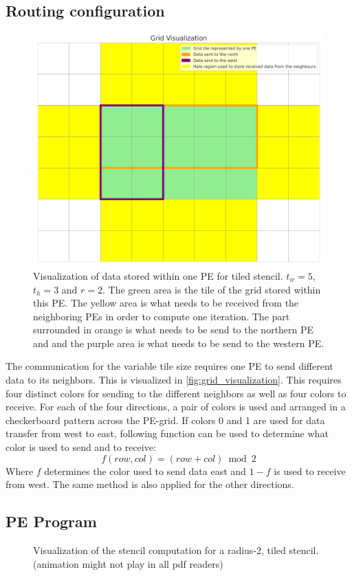 \subsection{Routing configuration}
\begin{figure}
    \centering
    \includegraphics[width=0.5\linewidth]{plots/grid_visualization.png}
    \caption{Visualization of data stored within one PE for tiled stencil. $t_w=5$, $t_h=3$ and $r=2$. The green area is the tile of the grid stored within this PE. The yellow area is what needs to be received from the neighboring PEs in order to compute one iteration. The part surrounded in orange is what needs to be send to the northern PE and and the purple area is what needs to be send to the western PE.}
    \label{fig:grid_visualization}
\end{figure}
The communication for the variable tile size requires one PE to send different data to its neighbors. This is visualized in \autoref{fig:grid_visualization}. This requires four distinct colors for sending to the different neighbors as well as four colors to receive. For each of the four directions, a pair of colors is used and arranged in a checkerboard pattern across the PE-grid.
If colors 0 and 1 are used for data transfer from west to east, following function can be used to determine what color is used to send and to receive:
\begin{equation}
    \label{eq:tiled_coloring_function}
    f(row, col)=(row+col) \bmod 2
\end{equation}
Where $f$ determines the color used to send data east and $1-f$ is used to receive from west. The same method is also applied for the other directions.

\subsection{PE Program}

\begin{figure}
    \centering
    \caption{Visualization of the stencil computation for a radius-2, tiled stencil. (animation might not play in all pdf readers)}
    \label{fig:stencil_algorithm_animation}
\end{figure}

